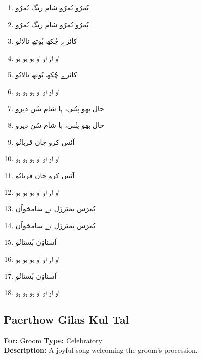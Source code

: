 \documentclass[12pt]{article}
\newcommand{\bigarabic}[1]{\fontsize{16pt}{18pt}\selectfont \textarabic{#1}}
\begin{document}
\begin{multicols}{2}
\begin{RTL}
\begin{enumerate}[leftmargin=*, label=\arabic*., font=\fontsize{16pt}{18pt}\selectfont]
  \item \bigarabic{بُمرُو بُمرُو شام رنگ بُمرُو}
  \item \bigarabic{بُمرُو بُمرُو شام رنگ بُمرُو}
  \item \bigarabic{کائزے چُکھ یُوتھ نالانُو}
  \item \bigarabic{او او او او ہو ہو ہو}
  \item \bigarabic{کائزے چُکھ یُوتھ نالانُو}
  \item \bigarabic{او او او او ہو ہو ہو}
  \item \bigarabic{حال بھو پنُنی، ہا شام سُن دیرو}
  \item \bigarabic{حال بھو پنُنی، ہا شام سُن دیرو}
  \item \bigarabic{آئس کرو جان قربانُو}
  \item \bigarabic{او او او او ہو ہو ہو}
  \item \bigarabic{آئس کرو جان قربانُو}
  \item \bigarabic{او او او او ہو ہو ہو}
  \item \bigarabic{بُمرَس یمبَرزَل بے سامخواُن}
  \item \bigarabic{بُمرَس یمبَرزَل بے سامخواُن}
  \item \bigarabic{آسناوَن بُستانُو}
  \item \bigarabic{او او او او ہو ہو ہو}
  \item \bigarabic{آسناوَن بُستانُو}
  \item \bigarabic{او او او او ہو ہو ہو}
\end{enumerate}
\end{RTL}
\end{multicols}

\subsection*{Paerthow Gilas Kul Tal}
\textbf{For:} Groom \quad \textbf{Type:} Celebratory\\
\textbf{Description:} A joyful song welcoming the groom's procession.
\end{document}
